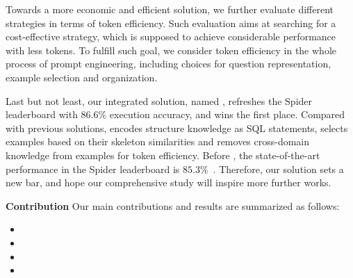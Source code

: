  
Towards a more economic and efficient solution, we further evaluate different strategies in terms of token efficiency. 
Such evaluation aims at searching for a cost-effective strategy, which is supposed to achieve considerable performance with less tokens. 
To fulfill such goal, we consider token efficiency in the whole process of prompt engineering, including choices for question representation, example selection and organization.

Last but not least, our integrated solution, named \ours, refreshes the Spider leaderboard with $86.6\%$ execution accuracy, and wins the first place. 
Compared with previous solutions, \ours encodes structure knowledge as SQL statements, selects examples based on their skeleton similarities and removes cross-domain knowledge from examples for token efficiency. 
Before \ours, the state-of-the-art performance in the Spider leaderboard is $85.3\%$~\cite{din-sql}. 
Therefore, our solution sets a new bar, and hope our comprehensive study will inspire more further works. 

\textbf{Contribution} Our main contributions and results are summarized as follows: 
\begin{itemize} 
    \item {}
    \item {}
    \item {} 	
    \item {}
\end{itemize}
